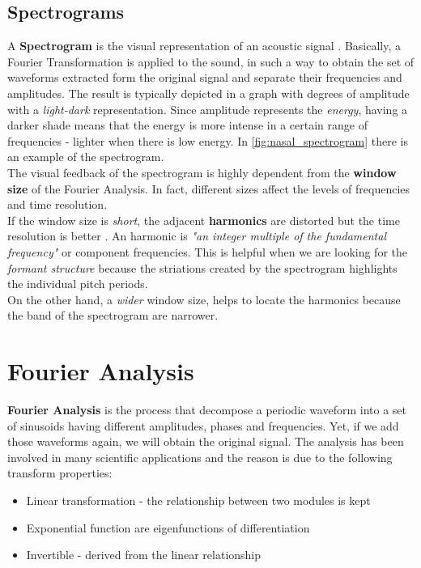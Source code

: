 \subsection{Spectrograms}
\label{sec:spectrograms}
A \textbf{Spectrogram} is the visual representation of an acoustic signal \cite{spectrogram_def}. Basically, a Fourier Transformation is applied to the sound, in such a way to obtain the set of waveforms extracted form the original signal and separate their frequencies and amplitudes. The result is typically depicted in a graph with degrees of amplitude with a \textit{light-dark} representation. Since amplitude represents the \textit{energy}, having a darker shade means that the energy is more intense in a certain range of frequencies - lighter when there is low energy. In \ref{fig:nasal_spectrogram} there is an example of the spectrogram. \\
\noindent The visual feedback of the spectrogram is highly dependent from the \textbf{window size} of the Fourier Analysis. In fact, different sizes affect the levels of frequencies and time resolution. \\
\noindent If the window size is \textit{short}, the adjacent \textbf{harmonics} are distorted but the time resolution is better \cite{spectrogram_def}. An harmonic is \textit{"an integer multiple of the fundamental frequency"}\cite{harmonic_wiki} or component frequencies. This is helpful when we are looking for the \textit{formant structure} because the striations created by the spectrogram highlights the individual pitch periods. \\
\noindent On the other hand, a \textit{wider} window size, helps to locate the harmonics because the band of the spectrogram are narrower.


\section{Fourier Analysis}
\label{sec:fourier_analysis}
\textbf{Fourier Analysis} is the process that decompose a periodic waveform into a set of sinusoids having different amplitudes, phases and frequencies. Yet, if we add those waveforms again, we will obtain the original signal. The analysis has been involved in many scientific applications and the reason is due to the following transform properties:

\begin{itemize}
	\item Linear transformation - the relationship between two modules is kept
	\item Exponential function are eigenfunctions of differentiation \cite{evans1997partial}
	\item Invertible - derived from the linear relationship
\end{itemize}


